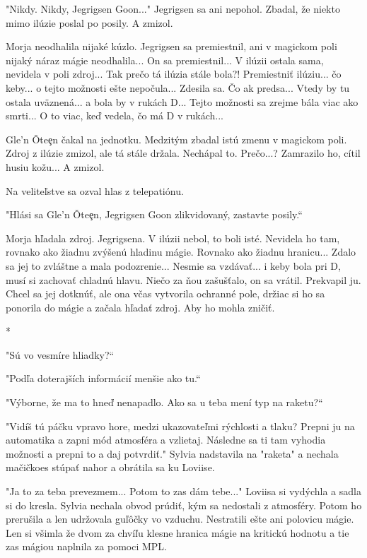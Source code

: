 \documentclass{book}
\begin{document}
"$ $Nikdy. Nikdy, Jegrigsen Goon..."$ $ Jegrigsen sa ani nepohol. Zbadal, že niekto mimo ilúzie poslal po posily. A zmizol.

Morja neodhalila nijaké kúzlo. Jegrigsen sa premiestnil, ani v magickom poli nijaký náraz mágie neodhalila... On sa premiestnil... V ilúzii ostala sama, nevidela v poli zdroj... Tak prečo tá ilúzia stále bola?! Premiestniť ilúziu... čo keby... o tejto možnosti ešte nepočula... Zdesila sa. Čo ak predsa... Vtedy by tu ostala uväznená... a bola by v rukách D... Tejto možnosti sa zrejme bála viac ako smrti... O to viac, keď vedela, čo má D v rukách...

Gle'n O\v{}te\c{e}n čakal na jednotku. Medzitým zbadal istú zmenu v magickom poli. Zdroj z ilúzie zmizol, ale tá stále držala. Nechápal to. Prečo...? Zamrazilo ho, cítil husiu kožu... A zmizol.

Na veliteľstve sa ozval hlas z telepatiónu.

"$ $Hlási sa Gle'n O\v{}te\c{e}n, Jegrigsen Goon zlikvidovaný, zastavte posily.“

Morja hľadala zdroj. Jegrigsena. V ilúzii nebol, to boli isté. Nevidela ho tam, rovnako ako žiadnu zvýšenú hladinu mágie. Rovnako ako žiadnu hranicu... Zdalo sa jej to zvláštne a mala podozrenie... Nesmie sa vzdávať... i keby bola pri D, musí si zachovať chladnú hlavu. Niečo za ňou zašušťalo, on sa vrátil. Prekvapil ju. Chcel sa jej dotknúť, ale ona včas vytvorila ochranné pole, držiac si ho sa ponorila do mágie a začala hľadať zdroj. Aby ho mohla zničiť.

\begin{center}

*

\end{center}

"$ $Sú vo vesmíre hliadky?“

"$ $Podľa doterajších informácií menšie ako tu.“

"$ $Výborne, že ma to hneď nenapadlo. Ako sa u teba mení typ na raketu?“

"$ $Vidíš tú páčku vpravo hore, medzi ukazovateľmi rýchlosti a tlaku? Prepni ju na automatika a zapni mód atmosféra a vzlietaj. Následne sa ti tam vyhodia možnosti a prepni to a daj potvrdiť."$ $ Sylvia nadstavila na "$ $raketa"$ $ a nechala mačičkoes stúpať nahor a obrátila sa ku Loviise.

"$ $Ja to za teba prevezmem... Potom to zas dám tebe..."$ $ Loviisa si vydýchla a sadla si do kresla. Sylvia nechala obvod prúdiť, kým sa nedostali z atmosféry. Potom ho prerušila a len udržovala guľôčky vo vzduchu. Nestratili ešte ani polovicu mágie. Len si všimla že dvom za chvíľu klesne hranica mágie na kritickú hodnotu a tie zas mágiou naplnila za pomoci MPL.
\end{document}
